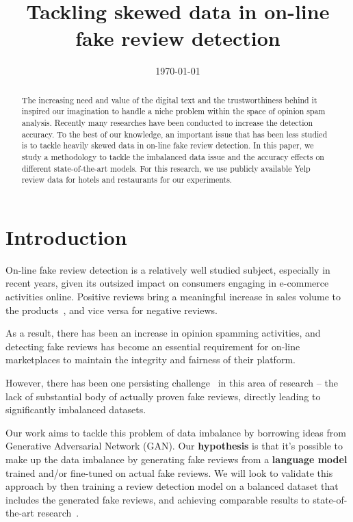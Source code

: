 \documentclass[conference, 11pt]{IEEEtran} %
\title{Tackling skewed data in on-line fake review detection}
\date{\today}
\author{\IEEEauthorblockN{Satheesh Joseph}
\IEEEauthorblockA{satheeshrishi@berkeley.edu}
\and
\IEEEauthorblockN{Catherine Mou}
\IEEEauthorblockA{catherine041616@berkeley.edu}
\and
\IEEEauthorblockN{Yi Zhang}
\IEEEauthorblockA{yizhang7210@berkeley.edu}
}
\theoremstyle{plain}
\theoremstyle{definition}
\begin{document}
\maketitle



\begin{abstract}
The increasing need and value of the digital text and the trustworthiness behind it inspired our imagination to handle a niche problem within the space of opinion spam analysis. Recently many researches have been conducted to increase the detection accuracy. To the best of our knowledge, an important issue that has been less studied is to tackle heavily skewed data in on-line fake review detection. In this paper, we study a methodology to tackle the imbalanced data issue and the accuracy effects on different state-of-the-art models. For this research, we use publicly available Yelp review data for hotels and restaurants for our experiments.
\end{abstract}

\section{Introduction}
\label{intro}
On-line fake review detection is a relatively well studied subject, especially in recent years, given its outsized impact on consumers engaging in e-commerce activities online. Positive reviews bring a meaningful increase in sales volume to the products~\cite{ho2013effects}, and vice versa for negative reviews.

As a result, there has been an increase in opinion spamming activities, and detecting fake reviews has become an essential requirement for on-line marketplaces to maintain the integrity and fairness of their platform.

However, there has been one persisting challenge~\cite{stanton2019gans, Tang2020, wang2020fake, yuan2019learning} in this area of research -- the lack of substantial body of actually proven fake reviews, directly leading to significantly imbalanced datasets.

Our work aims to tackle this problem of data imbalance by borrowing ideas from Generative Adversarial Network (GAN). Our \textbf{hypothesis} is that it's possible to make up the data imbalance by generating fake reviews from a \textbf{language model} trained and/or fine-tuned on actual fake reviews. We will look to validate this approach by then training a review detection model on a balanced dataset that includes the generated fake reviews, and achieving comparable results to state-of-the-art research~\cite{Tang2020}.
\end{document}
